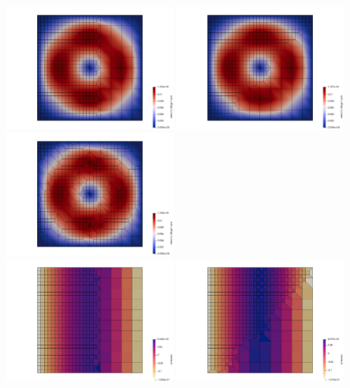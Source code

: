 \begin{center}
\includegraphics[width=5.6cm]{python_codes/fieldstone_102/results/test1/vel}
\includegraphics[width=5.6cm]{python_codes/fieldstone_102/results/test2/vel}
\includegraphics[width=5.6cm]{python_codes/fieldstone_102/results/test3/vel}\\
\includegraphics[width=5.6cm]{python_codes/fieldstone_102/results/test1/press}
\includegraphics[width=5.6cm]{python_codes/fieldstone_102/results/test2/press}

\end{center}
